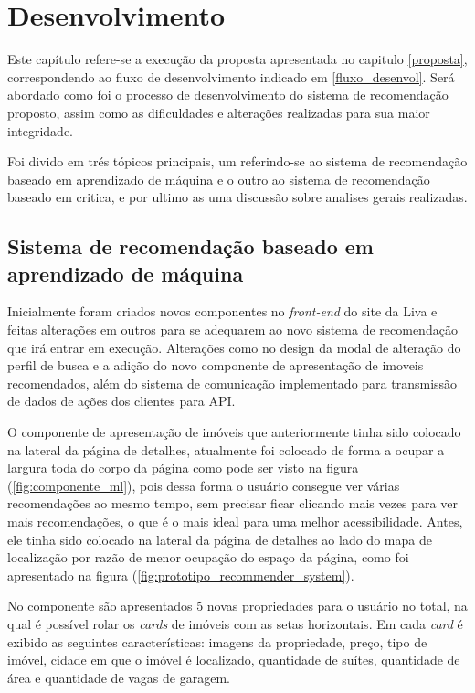 \chapter{Desenvolvimento}

Este capítulo refere-se a execução da proposta apresentada no capitulo \ref{proposta}, correspondendo ao fluxo de desenvolvimento indicado em \ref{fluxo_desenvol}. Será abordado como foi o processo de desenvolvimento do sistema de recomendação proposto, assim como as dificuldades e alterações realizadas para sua maior integridade.

Foi divido em trés tópicos principais, um referindo-se ao sistema de recomendação baseado em aprendizado de máquina e o outro ao sistema de recomendação baseado em critica, e por ultimo as uma discussão sobre analises gerais realizadas.

\section{Sistema de recomendação baseado em aprendizado de máquina}

Inicialmente foram criados novos componentes no \textit{front-end} do site da Liva e feitas alterações em outros para se adequarem ao novo sistema de recomendação que irá entrar em execução. Alterações como no design da modal de alteração do perfil de busca e a adição do novo componente de apresentação de imoveis recomendados, além do sistema de comunicação implementado para transmissão de dados de ações dos clientes para API.

O componente de apresentação de imóveis que anteriormente tinha sido colocado na lateral da página de detalhes, atualmente foi colocado de forma a ocupar a largura toda do corpo da página como pode ser visto na figura (\ref{fig:componente_ml}), pois dessa forma o usuário consegue ver várias recomendações ao mesmo tempo, sem precisar ficar clicando mais vezes para ver mais recomendações, o que é o mais ideal para uma melhor acessibilidade. Antes, ele tinha sido colocado na lateral da página de detalhes ao lado do mapa de localização por razão de menor ocupação do espaço da página, como foi apresentado na figura (\ref{fig:prototipo_recommender_system}).

No componente são apresentados 5 novas propriedades para o usuário no total, na qual é possível rolar os \textit{cards} de imóveis com as setas horizontais. Em cada \textit{card} é exibido as seguintes características: imagens da propriedade, preço, tipo de imóvel, cidade em que o imóvel é localizado, quantidade de suítes, quantidade de área e quantidade de vagas de garagem.

